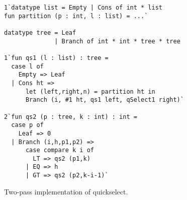 \begin{figure}
\begin{lstlisting}
1`datatype list = Empty | Cons of int * list
fun partition (p : int, l : list) = ...`

datatype tree = Leaf
              | Branch of int * int * tree * tree

1`fun qs1 (l : list) : tree =
  case l of
    Empty => Leaf
  | Cons ht => 
      let (left,right,n) = partition ht in
      Branch (i, #1 ht, qs1 left, qSelect1 right)`

2`fun qs2 (p : tree, k : int) : int = 
  case p of
    Leaf => 0
  | Branch (i,h,p1,p2) => 
      case compare k i of
        LT => qs2 (p1,k)
      | EQ => h
      | GT => qs2 (p2,k-i-1)`
\end{lstlisting}
\caption{Two-pass implementation of quickselect.}
\label{fig:qs-split}
\end{figure}

